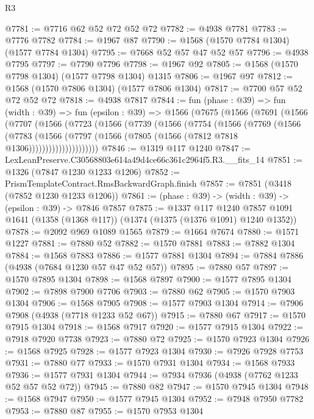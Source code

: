 \begin{lexlean}{R3}
\begin{coremodule}
@7781 := @7716 @62 @52 @72 @52 @72
@7782 := @4938 @7781
@7783 := @7776 @7782
@7784 := @1967 @87
@7790 := @1568 (@1570 @7784 @1304) (@1577 @7784 @1304)
@7795 := @7668 @52 @57 @47 @52 @57
@7796 := @4938 @7795
@7797 := @7790 @7796
@7798 := @1967 @92
@7805 := @1568 (@1570 @7798 @1304) (@1577 @7798 @1304) @1315
@7806 := @1967 @97
@7812 := @1568 (@1570 @7806 @1304) (@1577 @7806 @1304)
@7817 := @7700 @57 @52 @72 @52 @72
@7818 := @4938 @7817
@7844 := fun (phase : @39) =>
  fun (width : @39) =>
  fun (epsilon : @39) =>
  @1566
    (@7675
      (@1566
        (@7691
          (@1566
            (@7707
              (@1566
                (@7723
                  (@1566
                    (@7739
                      (@1566
                        (@7754
                          (@1566
                            (@7769
                              (@1566
                                (@7783
                                  (@1566
                                    (@7797
                                      (@1566 (@7805 (@1566 (@7812 @7818 @1306)))))))))))))))))))))
@7846 := @1319 @117 @1240
@7847 := LexLeanPreserve.C30568803e614a49d4ce66c361c2964f5.R3.__fits_14
@7851 := @1326 (@7847 @1230 @1233 @1206)
@7852 := PrismTemplateContract.RmsBackwardGraph.finish
@7857 := @7851 (@3418 (@7852 @1230 @1233 @1206))
@7861 := (phase : @39) -> (width : @39) -> (epsilon : @39) -> @7846 @7857
@7875 := @1337
    @117
    @1240
    @7857
    @1091
    @1641
    (@1358 (@1368 @117))
    (@1374 (@1375 (@1376 @1091) @1240 @1352))
@7878 := @2092 @969 @1089 @1565
@7879 := @1664 @7674
@7880 := @1571 @1227
@7881 := @7880 @52
@7882 := @1570 @7881
@7883 := @7882 @1304
@7884 := @1568 @7883
@7886 := @1577 @7881 @1304
@7894 := @7884 @7886 (@4938 (@7684 @1230 @57 @47 @52 @57))
@7895 := @7880 @57
@7897 := @1570 @7895 @1304
@7898 := @1568 @7897
@7900 := @1577 @7895 @1304
@7902 := @7898 @7900 @7706
@7903 := @7880 @62
@7905 := @1570 @7903 @1304
@7906 := @1568 @7905
@7908 := @1577 @7903 @1304
@7914 := @7906 @7908 (@4938 (@7718 @1233 @52 @67))
@7915 := @7880 @67
@7917 := @1570 @7915 @1304
@7918 := @1568 @7917
@7920 := @1577 @7915 @1304
@7922 := @7918 @7920 @7738
@7923 := @7880 @72
@7925 := @1570 @7923 @1304
@7926 := @1568 @7925
@7928 := @1577 @7923 @1304
@7930 := @7926 @7928 @7753
@7931 := @7880 @77
@7933 := @1570 @7931 @1304
@7934 := @1568 @7933
@7936 := @1577 @7931 @1304
@7944 := @7934 @7936 (@4938 (@7762 @1233 @52 @57 @52 @72))
@7945 := @7880 @82
@7947 := @1570 @7945 @1304
@7948 := @1568 @7947
@7950 := @1577 @7945 @1304
@7952 := @7948 @7950 @7782
@7953 := @7880 @87
@7955 := @1570 @7953 @1304

\end{coremodule}
\end{lexlean}
